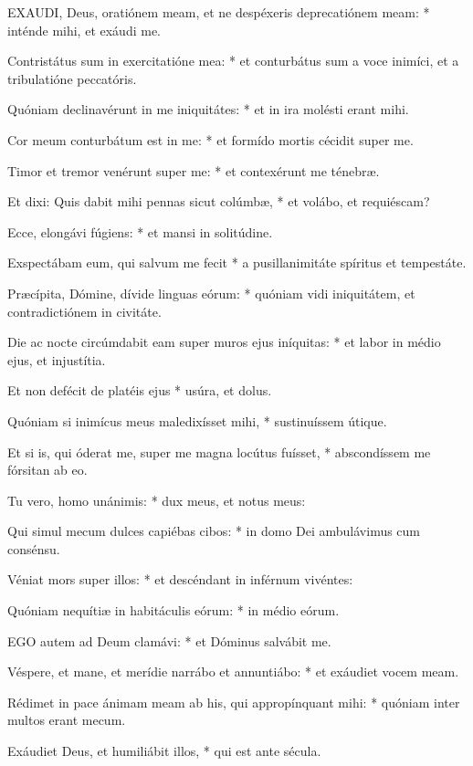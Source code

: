 
\lettrine[lines=2]{E}{XAUDI}, Deus, oratiónem meam, et ne despéxeris deprecatiónem meam: * inténde mihi, et exáudi me.

Contristátus sum in exercitatióne mea: * et conturbátus sum a voce inimíci, et a tribulatióne peccatóris.

Quóniam declinavérunt in me iniquitátes: * et in ira molésti erant mihi.

Cor meum conturbátum est in me: * et formído mortis cécidit super me.

Timor et tremor venérunt super me: * et contexérunt me ténebræ.

Et dixi: Quis dabit mihi pennas sicut colúmbæ, * et volábo, et requiéscam?

Ecce, elongávi fúgiens: * et mansi in solitúdine.

Exspectábam eum, qui salvum me fecit * a pusillanimitáte spíritus et tempestáte.

Præcípita, Dómine, dívide linguas eórum: * quóniam vidi iniquitátem, et contradictiónem in civitáte.

Die ac nocte circúmdabit eam super muros ejus iníquitas: * et labor in médio ejus, et injustítia.

Et non defécit de platéis ejus * usúra, et dolus.

Quóniam si inimícus meus maledixísset mihi, * sustinuíssem útique.

Et si is, qui óderat me, super me magna locútus fuísset, * abscondíssem me fórsitan ab eo.

Tu vero, homo unánimis: * dux meus, et notus meus:

Qui simul mecum dulces capiébas cibos: * in domo Dei ambulávimus cum consénsu.

Véniat mors super illos: * et descéndant in inférnum vivéntes:

Quóniam nequítiæ in habitáculis eórum: * in médio eórum.


\lettrine[lines=2]{E}{GO} autem ad Deum clamávi: * et Dóminus salvábit me.

Véspere, et mane, et merídie narrábo et annuntiábo: * et exáudiet vocem meam.

Rédimet in pace ánimam meam ab his, qui appropínquant mihi: * quóniam inter multos erant mecum.

Exáudiet Deus, et humiliábit illos, * qui est ante sécula.

